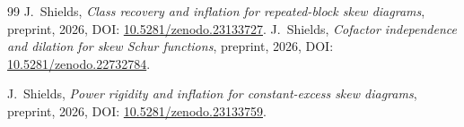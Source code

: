 \documentclass[11pt,a4paper]{amsart}
\numberwithin{equation}{section}
\theoremstyle{plain}
\theoremstyle{definition}
\begin{document}
\begin{thebibliography}{99}
J.~Shields,
\emph{Class recovery and inflation for repeated-block skew diagrams},
preprint, 2026,
DOI: \href{https://doi.org/10.5281/zenodo.23133727}{10.5281/\allowbreak zenodo.23133727}.
J.~Shields,
\emph{Cofactor independence and dilation for skew Schur functions},
preprint, 2026,
DOI: \href{https://doi.org/10.5281/zenodo.22732784}{10.5281/\allowbreak zenodo.22732784}.

J.~Shields,
\emph{Power rigidity and inflation for constant-excess skew diagrams},
preprint, 2026,
DOI: \href{https://doi.org/10.5281/zenodo.23133759}{10.5281/\allowbreak zenodo.23133759}.
\end{thebibliography}
\end{document}
